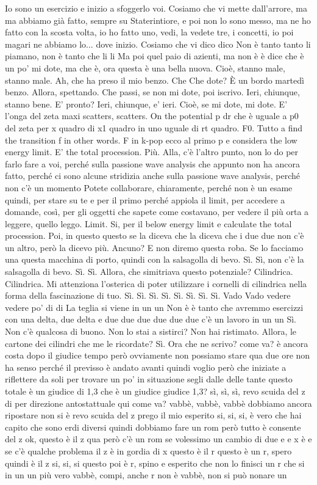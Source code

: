 \begin{soluzione}
   Io sono un esercizio e inizio a sfoggerlo voi. Cosiamo che vi mette dall'arrore, ma ma abbiamo già fatto, sempre su Staterintiore, e poi non lo sono messo, ma ne ho fatto con la scosta volta, io ho fatto uno, vedi, la vedete tre, i concetti, io poi magari ne abbiamo lo... dove inizio. Cosiamo che vi dico dico Non è tanto tanto li piamano, non è tanto che li li Ma poi quel paio di azienti, ma non è è dice che è un po' mi dote, ma che è, ora questa è una bella nuova. Cioè, stanno male, stanno male. Ah, che ha preso il mio benzo. Che Che dote? È un bordo martedì benzo. Allora, spettando. Che passi, se non mi dote, poi iscrivo. Ieri, chiunque, stanno bene. E' pronto? Ieri, chiunque, e' ieri. Cioè, se mi dote, mi dote. E' l'onga del zeta maxi scatters, scatters. On the potential p dr che è uguale a p0 del zeta per x quadro di x1 quadro in uno uguale di rt quadro. F0. Tutto a find the transition f in other words. F in k-pop ecco al primo p e considera the low energy limit. E' the total procession. Più. Alla, c'è l'altro punto, non lo do per farlo fare a voi, perché sulla passione wave analysis che appunto non ha ancora fatto, perché ci sono alcune stridizia anche sulla passione wave analysis, perché non c'è un momento Potete collaborare, chiaramente, perché non è un esame quindi, per stare su te e per il primo perché appiola il limit, per accedere a domande, così, per gli oggetti che sapete come costavano, per vedere il più orta a leggere, quello leggo. Limit. Si, per il below energy limit e calculate the total procession. Poi, in questo questo se la diceva che la diceva che i due due non c'è un altro, però la dicevo più. Ancuno? E non diremo questa roba. Se lo facciamo una questa macchina di porto, quindi con la salsagolla di bevo. Sì. Sì, non c'è la salsagolla di bevo. Sì. Sì. Allora, che simitriava questo potenziale? Cilindrica. Cilindrica. Mi attenziona l'osterica di poter utilizzare i cornelli di cilindrica nella forma della fascinazione di tuo. Sì. Sì. Sì. Sì. Sì. Sì. Sì. Sì. Vado Vado vedere vedere po' di di La teglia si viene in un un Non è è tanto che avremmo esercizzi con una delta, due delta e due due due due due due c'è un lavoro in un un Sì. Non c'è qualcosa di buono. Non lo stai a sistirci? Non hai ristimato. Allora, le cartone dei cilindri che me le ricordate? Sì. Ora che ne scrivo? come va? è ancora costa dopo il giudice tempo però ovviamente non possiamo stare qua due ore non ha senso perché il previsso è andato avanti quindi voglio però che iniziate a riflettere da soli per trovare un po' in situazione segli dalle delle tante questo totale è un giudice di 1,3 che è un giudice giudice 1,3? sì, sì, sì, revo scuida del z di per direzione antostattuale qui come va? vabbè, vabbè, vabbè dobbiamo ancora ripostare non si è revo scuida del z prego il mio esperito si, si, si, è vero che hai capito che sono erdi diversi quindi dobbiamo fare un rom però tutto è consente del z ok, questo è il z qua però c'è un rom se volessimo un cambio di due e e x è e se c'è qualche problema il z è in gordia di x questo è il r questo è un r, spero quindi è il z si, si, si questo poi è r, spino e esperito che non lo finisci un r che si in un un più vero vabbè, compi, anche r non è vabbè, non si può nonare un 
\end{soluzione}
